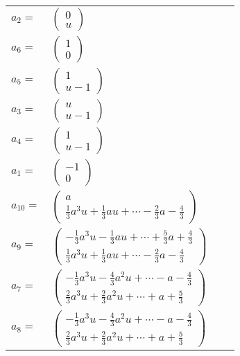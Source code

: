 \documentclass[1p]{elsarticle_modified}
\theoremstyle{definition}
\begin{document}
\begin{tabular}{m{7pt} m{180pt} m{7pt} m{180pt} }
\flushright $a_{2}=$&$\begin{pmatrix}0\\u\end{pmatrix}$ \\
\flushright $a_{6}=$&$\begin{pmatrix}1\\0\end{pmatrix}$ \\
\flushright $a_{5}=$&$\begin{pmatrix}1\\u-1\end{pmatrix}$ \\
\flushright $a_{3}=$&$\begin{pmatrix}u\\u-1\end{pmatrix}$ \\
\flushright $a_{4}=$&$\begin{pmatrix}1\\u-1\end{pmatrix}$ \\
\flushright $a_{1}=$&$\begin{pmatrix}-1\\0\end{pmatrix}$ \\
\flushright $a_{10}=$&$\begin{pmatrix}a\\\frac{1}{3} a^3 u+\frac{1}{3} a u+\cdots-\frac{2}{3} a-\frac{4}{3}\end{pmatrix}$ \\
\flushright $a_{9}=$&$\begin{pmatrix}-\frac{1}{3} a^3 u-\frac{1}{3} a u+\cdots+\frac{5}{3} a+\frac{4}{3}\\\frac{1}{3} a^3 u+\frac{1}{3} a u+\cdots-\frac{2}{3} a-\frac{4}{3}\end{pmatrix}$ \\
\flushright $a_{7}=$&$\begin{pmatrix}-\frac{1}{3} a^3 u-\frac{4}{3} a^2 u+\cdots- a-\frac{4}{3}\\\frac{2}{3} a^3 u+\frac{2}{3} a^2 u+\cdots+a+\frac{5}{3}\end{pmatrix}$ \\
\flushright $a_{8}=$&$\begin{pmatrix}-\frac{1}{3} a^3 u-\frac{4}{3} a^2 u+\cdots- a-\frac{4}{3}\\\frac{2}{3} a^3 u+\frac{2}{3} a^2 u+\cdots+a+\frac{5}{3}\end{pmatrix}$ \\

\end{tabular}
\end{document}
